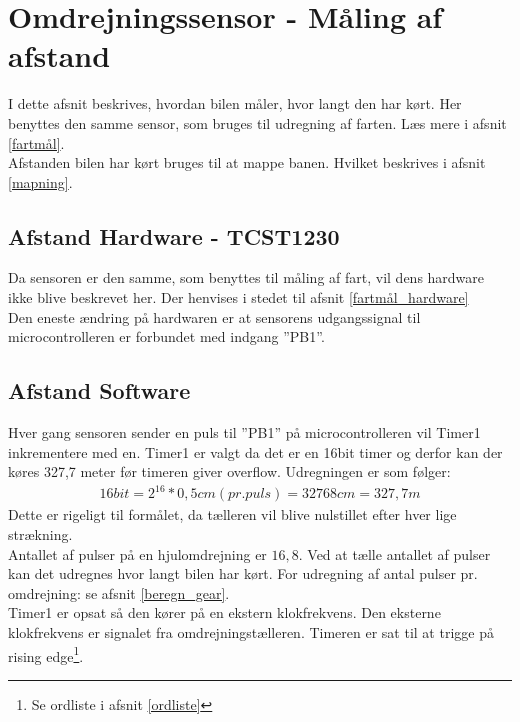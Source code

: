\section{Omdrejningssensor - Måling af afstand}
\label{afstandmaal}
I dette afsnit beskrives, hvordan bilen måler, hvor langt den har kørt. Her benyttes den samme sensor, som bruges til udregning af farten. Læs mere i afsnit \ref{fartmål}. \\
Afstanden bilen har kørt bruges til at mappe banen. Hvilket beskrives i afsnit \ref{mapning}.

\subsection{Afstand Hardware - TCST1230}
\label{afstandmaal_hardware}
Da sensoren er den samme, som benyttes til måling af fart, vil dens hardware ikke blive beskrevet her. Der henvises i stedet til afsnit \ref{fartmål_hardware} \\
Den eneste ændring på hardwaren er at sensorens udgangssignal til microcontrolleren er forbundet med indgang ”PB1”.

\subsection{Afstand Software}
\label{afstandmaal_software}
Hver gang sensoren sender en puls til ”PB1” på microcontrolleren vil Timer1 inkrementere med en. Timer1 er valgt da det er en 16bit timer og derfor kan der køres 327,7 meter før timeren giver overflow. Udregningen er som følger: 
\begin{align*}
16bit = 2^{16} * 0,5cm (pr. puls) = 32768 cm = 327,7 m
\end{align*}
Dette er rigeligt til formålet, da tælleren vil blive nulstillet efter hver lige strækning. \\

Antallet af pulser på en hjulomdrejning er \(16,8\). Ved at tælle antallet af pulser kan det udregnes hvor langt bilen har kørt.  For udregning af antal pulser pr. omdrejning: se afsnit \ref{beregn_gear}. \\

Timer1 er opsat så den kører på en ekstern klokfrekvens. Den eksterne klokfrekvens er signalet fra omdrejningstælleren. Timeren er sat til at trigge på rising edge\footnote{Se ordliste i afsnit \ref{ordliste}}. 

